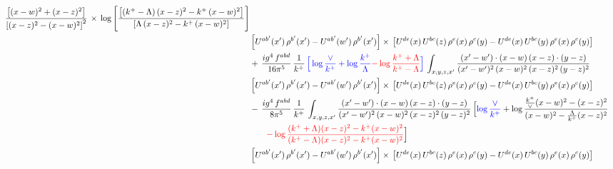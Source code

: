 \documentclass[9pt]{article}
\numberwithin{equation}{section}
\begin{document}
\begin{align}
\frac{\left[(x-w)^{2}+(x-z)^{2}\right]}{\left[(x-z)^{2}-(x-w)^{2}\right]^{2}}\, \times\, \log{\left[\frac{\left[(k^{+}-\Lambda)\, (x-z)^{2} - k^{+}\, (x-w)^{2}\right]}{\left[\Lambda\, (x-z)^{2} - k^{+}\, (x-w)^{2}\right]}\right]}\notag \\ & \left[U^{ab'}(x')\,\rho^{b'}(x')-U^{ab'}(w')\, \rho^{b'}(x')\right]\times\, \left[U^{de}(x)\,U^{bc}(z)\, \rho^{e}(x)\,\rho^{c}(y)-U^{de}(x)\,U^{bc}(y)\,\rho^{e}(x)\,\rho^{c}(y)\right]\notag \\ & +\, \frac{ig^{4}\,f^{abd}}{16\pi^{5}}\,\frac{1}{k^{+}}\,{\color{blue}\Big[\log\frac{\vee}{k^{+}}+\log\frac{k^{+}}{\Lambda}{\color{red}-\log\frac{k^{+}+\Lambda}{k^{+}-\Lambda}}\Big]}\,\int_{x,y,z,x'} \frac{(x'-w')\cdot (x-w)\, (x-z)\cdot (y-z)}{(x'-w')^{2}\, (x-w)^{2}\, (x-z)^{2}\, (y-z)^{2}}\, \notag \\ & \left[U^{ab'}(x')\,\rho^{b'}(x')-U^{ab'}(w')\, \rho^{b'}(x')\right]\times\, \left[U^{de}(x)\,U^{bc}(z)\, \rho^{e}(x)\,\rho^{c}(y)-U^{de}(x)\,U^{bc}(y)\,\rho^{e}(x)\,\rho^{c}(y)\right]\notag \\ &-\, \frac{ig^{4}\,f^{abd}}{8\pi^{5}}\,\frac{1}{k^{+}}\,\int_{x,y,z,x'}\frac{(x'-w')\cdot (x-w)\, (x-z)\cdot (y-z)}{(x'-w')^{2}\, (x-w)^{2}\, (x-z)^{2}\, (y-z)^{2}}\,\Big[{\color{blue}\log\frac{\vee}{k^{+}}}+\log\frac{\frac{k^{+}}{\vee}(x-w)^{2}-(x-z)^{2}}{(x-w)^{2}-\frac{\Lambda}{k^{+}}(x-z)^{2}}\notag \\ & \qquad{\color{red}-\log\frac{(k^{+}+\Lambda)(x-z)^{2}-k^{+}(x-w)^{2}}{(k^{+}-\Lambda)(x-z)^{2}-k^{+}(x-w)^{2}}}\Big] \notag \\ & \left[U^{ab'}(x')\,\rho^{b'}(x')-U^{ab'}(w')\, \rho^{b'}(x')\right]\times\, \left[U^{de}(x)\,U^{bc}(z)\, \rho^{e}(x)\,\rho^{c}(y)-U^{de}(x)\,U^{bc}(y)\,\rho^{e}(x)\,\rho^{c}(y)\right]
\end{align}
\end{document}
